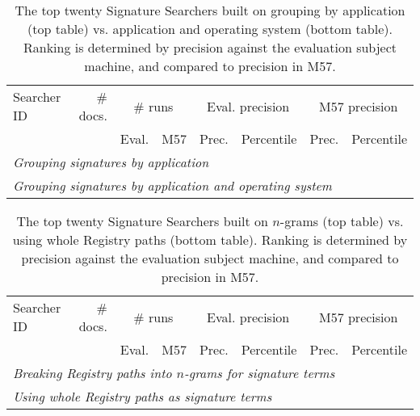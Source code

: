 \documentclass[11pt]{ucthesis}
\theoremstyle{plain}
\theoremstyle{definition}
\begin{document}
\begin{table}[htp]
\caption{\label{tbl:top10:docsby:precision}The top twenty Signature Searchers built on grouping by application (top table) vs. application and operating system (bottom table).  Ranking is determined by precision against the evaluation subject machine, and compared to precision in M57.}
\centering
\begin{small}
\begin{tabular}{lr|rr|rr|rr}
\toprule
Searcher ID & \# docs. & \multicolumn{2}{c|}{\# runs} & \multicolumn{2}{c|}{Eval. precision} & \multicolumn{2}{c}{M57 precision} \\
 & & Eval. & M57 & Prec. & Percentile & Prec. & Percentile \\
\midrule
\multicolumn{8}{l}{\emph{Grouping signatures by application}} \\

\midrule
\multicolumn{8}{l}{\emph{Grouping signatures by application and operating system}} \\

\bottomrule
\end{tabular}
\end{small}
\end{table}

\begin{table}[htp]
\caption{\label{tbl:top10:ngc:precision}The top twenty Signature Searchers built on $n$-grams (top table) vs. using whole Registry paths (bottom table).  Ranking is determined by precision against the evaluation subject machine, and compared to precision in M57.}
\centering
\begin{small}
\begin{tabular}{lr|rr|rr|rr}
\toprule
Searcher ID & \# docs. & \multicolumn{2}{c|}{\# runs} & \multicolumn{2}{c|}{Eval. precision} & \multicolumn{2}{c}{M57 precision} \\
 & & Eval. & M57 & Prec. & Percentile & Prec. & Percentile \\
\midrule
\multicolumn{8}{l}{\emph{Breaking Registry paths into $n$-grams for signature terms}} \\

\midrule
\multicolumn{8}{l}{\emph{Using whole Registry paths as signature terms}} \\

\bottomrule
\end{tabular}
\end{small}
\end{table}
\end{document}
